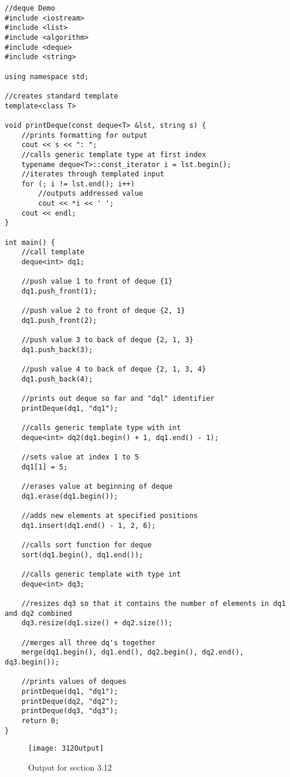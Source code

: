 \documentclass[11pt]{article}
\begin{document}
\begin{lstlisting}
//deque Demo
#include <iostream>
#include <list>
#include <algorithm>
#include <deque>
#include <string>

using namespace std;

//creates standard template
template<class T>

void printDeque(const deque<T> &lst, string s) {
    //prints formatting for output
    cout << s << ": ";
    //calls generic template type at first index
    typename deque<T>::const_iterator i = lst.begin();
    //iterates through templated input
    for (; i != lst.end(); i++)
        //outputs addressed value
        cout << *i << ' ';
    cout << endl;
}

int main() {
    //call template
    deque<int> dq1;

    //push value 1 to front of deque {1}
    dq1.push_front(1);

    //push value 2 to front of deque {2, 1}
    dq1.push_front(2);

    //push value 3 to back of deque {2, 1, 3}
    dq1.push_back(3);

    //push value 4 to back of deque {2, 1, 3, 4}
    dq1.push_back(4);

    //prints out deque so far and "dql" identifier
    printDeque(dq1, "dq1");

    //calls generic template type with int
    deque<int> dq2(dq1.begin() + 1, dq1.end() - 1);

    //sets value at index 1 to 5
    dq1[1] = 5;

    //erases value at beginning of deque
    dq1.erase(dq1.begin());

    //adds new elements at specified positions
    dq1.insert(dq1.end() - 1, 2, 6);

    //calls sort function for deque
    sort(dq1.begin(), dq1.end());

    //calls generic template with type int
    deque<int> dq3;

    //resizes dq3 so that it contains the number of elements in dq1 and dq2 combined
    dq3.resize(dq1.size() + dq2.size());

    //merges all three dq's together
    merge(dq1.begin(), dq1.end(), dq2.begin(), dq2.end(), dq3.begin());

    //prints values of deques
    printDeque(dq1, "dq1");
    printDeque(dq2, "dq2");
    printDeque(dq3, "dq3");
    return 0;
}
\end{lstlisting}

\begin{figure}[h]
    \centering
    \texttt{[image: 312Output]}
    \caption{Output for section 3.12}
    \label{fig:my_label}
\end{figure}
\end{document}
